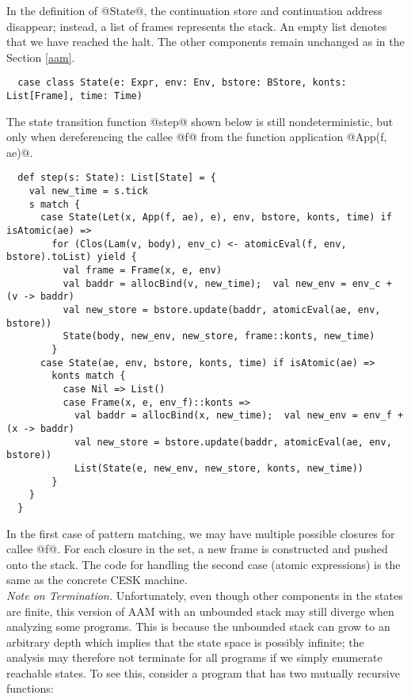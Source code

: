 \documentclass[acmsmall, screen]{acmart}\settopmatter{}
\begin{document}
In the definition of @State@, the continuation store and continuation address disappear;
instead, a list of frames represents the stack. An empty list denotes that we have reached
the halt. The other components remain unchanged as in the Section \ref{aam}.

\begin{lstlisting}
  case class State(e: Expr, env: Env, bstore: BStore, konts: List[Frame], time: Time)
\end{lstlisting}

The state transition function @step@ shown below is still
nondeterministic, but only when dereferencing the callee @f@ from the
function application @App(f, ae)@.

\begin{lstlisting}
  def step(s: State): List[State] = {
    val new_time = s.tick
    s match {
      case State(Let(x, App(f, ae), e), env, bstore, konts, time) if isAtomic(ae) =>
        for (Clos(Lam(v, body), env_c) <- atomicEval(f, env, bstore).toList) yield {
          val frame = Frame(x, e, env)
          val baddr = allocBind(v, new_time);  val new_env = env_c + (v -> baddr)
          val new_store = bstore.update(baddr, atomicEval(ae, env, bstore))
          State(body, new_env, new_store, frame::konts, new_time)
        }
      case State(ae, env, bstore, konts, time) if isAtomic(ae) =>
        konts match {
          case Nil => List()
          case Frame(x, e, env_f)::konts =>
            val baddr = allocBind(x, new_time);  val new_env = env_f + (x -> baddr)
            val new_store = bstore.update(baddr, atomicEval(ae, env, bstore))
            List(State(e, new_env, new_store, konts, new_time))
        }
    }
  }
\end{lstlisting}

In the first case of pattern matching, we may have multiple possible closures for callee @f@.
For each closure in the set, a new frame is constructed and pushed onto the stack.
The code for handling the second case (atomic expressions) is the same as the concrete CESK machine. \\

\textit{Note on Termination.}
Unfortunately, even though other components in the states are finite, this version of AAM with an unbounded
stack may still diverge when analyzing some programs.
This is because the unbounded stack can grow to an arbitrary depth which implies that the state
space is possibly infinite; the analysis may therefore not terminate for all programs if we
simply enumerate reachable states. To see this, consider a program that has two mutually
recursive functions:
\end{document}
